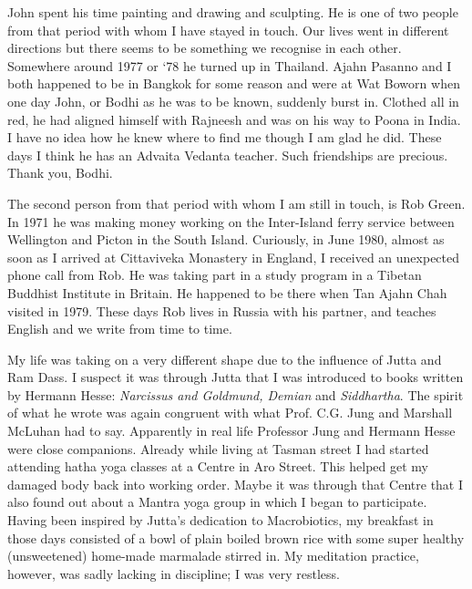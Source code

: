 John spent his time painting and drawing and sculpting. He is one of two
people from that period with whom I have stayed in touch. Our lives went
in different directions but there seems to be something we recognise in
each other. Somewhere around 1977 or `78 he turned up in Thailand. Ajahn
Pasanno and I both happened to be in Bangkok for some reason and were at
Wat Boworn when one day John, or Bodhi as he was to be known, suddenly
burst in. Clothed all in red, he had aligned himself with Rajneesh and
was on his way to Poona in India. I have no idea how he knew where to
find me though I am glad he did. These days I think he has an Advaita
Vedanta teacher. Such friendships are precious. Thank you, Bodhi.

The second person from that period with whom I am still in touch, is Rob
Green. In 1971 he was making money working on the Inter-Island ferry
service between Wellington and Picton in the South Island. Curiously, in
June 1980, almost as soon as I arrived at Cittaviveka Monastery in
England, I received an unexpected phone call from Rob. He was taking
part in a study program in a Tibetan Buddhist Institute in Britain. He
happened to be there when Tan Ajahn Chah visited in 1979. These days Rob
lives in Russia with his partner, and teaches English and we write from
time to time.

My life was taking on a very different shape due to the influence of
Jutta and Ram Dass. I suspect it was through Jutta that I was introduced
to books written by Hermann Hesse: \emph{Narcissus and Goldmund, Demian}
and \emph{Siddhartha}. The spirit of what he wrote was again congruent
with what Prof. C.G. Jung and Marshall McLuhan had to say. Apparently in
real life Professor Jung and Hermann Hesse were close companions.
Already while living at Tasman street I had started attending hatha yoga
classes at a Centre in Aro Street. This helped get my damaged body back
into working order. Maybe it was through that Centre that I also found
out about a Mantra yoga group in which I began to participate. Having
been inspired by Jutta's dedication to Macrobiotics, my breakfast in
those days consisted of a bowl of plain boiled brown rice with some
super healthy (unsweetened) home-made marmalade stirred in. My
meditation practice, however, was sadly lacking in discipline; I was
very restless.


